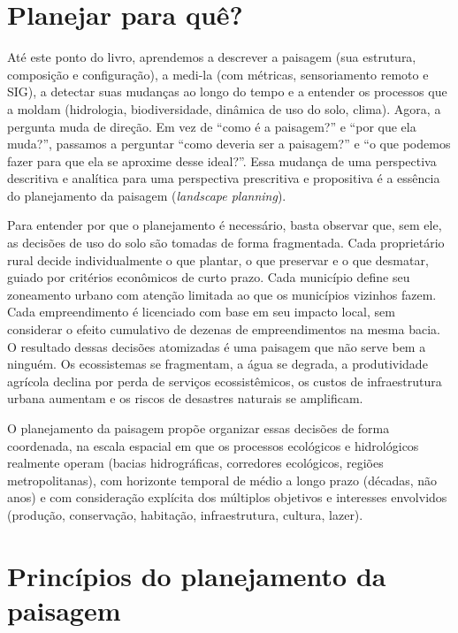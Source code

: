 \documentclass[
  portuguese,
  11pt,
  a4paper,
  open=any]{scrbook}
\begin{document}
\section{Planejar para quê?}\label{planejar-para-quuxea}

Até este ponto do livro, aprendemos a descrever a paisagem (sua
estrutura, composição e configuração), a medi-la (com métricas,
sensoriamento remoto e SIG), a detectar suas mudanças ao longo do tempo
e a entender os processos que a moldam (hidrologia, biodiversidade,
dinâmica de uso do solo, clima). Agora, a pergunta muda de direção. Em
vez de ``como é a paisagem?'' e ``por que ela muda?'', passamos a
perguntar ``como deveria ser a paisagem?'' e ``o que podemos fazer para
que ela se aproxime desse ideal?''. Essa mudança de uma perspectiva
descritiva e analítica para uma perspectiva prescritiva e propositiva é
a essência do planejamento da paisagem (\emph{landscape planning}).

Para entender por que o planejamento é necessário, basta observar que,
sem ele, as decisões de uso do solo são tomadas de forma fragmentada.
Cada proprietário rural decide individualmente o que plantar, o que
preservar e o que desmatar, guiado por critérios econômicos de curto
prazo. Cada município define seu zoneamento urbano com atenção limitada
ao que os municípios vizinhos fazem. Cada empreendimento é licenciado
com base em seu impacto local, sem considerar o efeito cumulativo de
dezenas de empreendimentos na mesma bacia. O resultado dessas decisões
atomizadas é uma paisagem que não serve bem a ninguém. Os ecossistemas
se fragmentam, a água se degrada, a produtividade agrícola declina por
perda de serviços ecossistêmicos, os custos de infraestrutura urbana
aumentam e os riscos de desastres naturais se amplificam.

O planejamento da paisagem propõe organizar essas decisões de forma
coordenada, na escala espacial em que os processos ecológicos e
hidrológicos realmente operam (bacias hidrográficas, corredores
ecológicos, regiões metropolitanas), com horizonte temporal de médio a
longo prazo (décadas, não anos) e com consideração explícita dos
múltiplos objetivos e interesses envolvidos (produção, conservação,
habitação, infraestrutura, cultura, lazer).

\section{Princípios do planejamento da
paisagem}\label{princuxedpios-do-planejamento-da-paisagem}
\end{document}

